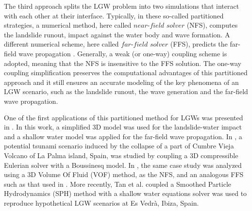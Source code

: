 The third approach splits the LGW problem into two simulations that interact with each other at their interface. Typically, in these so-called partitioned strategies, a numerical method, here called $near$-$field$ $solver$ (NFS), computes the landslide runout, impact against the water body and wave formation. A different numerical scheme, here called $far$-$field$ $solver$ (FFS), predicts the far-field wave propagation \cite{yavari2016numerical}.
Generally, a weak (or one-way) coupling scheme is adopted, meaning that the NFS is insensitive to the FFS solution. The one-way coupling simplification preserves the computational advantages of this partitioned approach and it still ensures an accurate modeling of the key phenomena of an LGW scenario, such as the landslide runout, the wave generation and the far-field wave propagation.
 
One of the first applications of this partitioned method for LGWs was presented in \cite{heinrich1998simulation}. In this work, a simplified 3D model was used for the landslide-water impact and a shallow water model was applied for the far-field wave propagation.
In \cite{lovholt2008oceanic}, a potential tsunami scenario induced by the collapse of a part of Cumbre Vieja Volcano of La Palma island, Spain, was studied by coupling a 3D compressible Eulerian solver with a Boussinesq model. In \cite{abadie2012numerical}, the same case study was analyzed using a 3D Volume Of Fluid (VOF) method, as the NFS, and an analogous FFS such as that used in \cite{lovholt2008oceanic}.
More recently, Tan et al. \cite{tan2018numerical} coupled a Smoothed Particle Hydrodynamics (SPH) method with a shallow water equations solver was used to reproduce hypothetical LGW scenarios at Es Vedrà, Ibiza, Spain.

